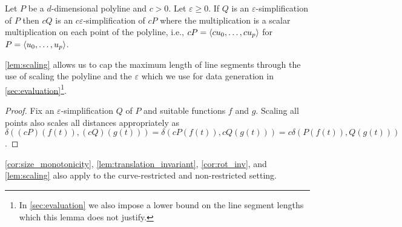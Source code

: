 \begin{lemma}\label{lem:scaling}
	Let \(P\) be a \(d\)-dimensional polyline and \(c > 0\). Let \(\varepsilon \geq 0\). If \(Q\) is an \(\varepsilon\)-simplification of \(P\) then \(cQ\) is an \(c\varepsilon\)-simplification of \(cP\) where the multiplication is a scalar multiplication on  each point of the polyline, i.e., \(cP = \left\langle cu_0, \dots, cu_p\right\rangle\) for \(P = \left\langle u_0,\dots, u_p\right\rangle\).
\end{lemma}

\cref{lem:scaling} allows us to cap the maximum length of line segments through the use of scaling the polyline and the \(\varepsilon\) which we use for data generation in \cref{sec:evaluation}\footnote{In \cref{sec:evaluation} we also impose a lower bound on the line segment lengths which this lemma does not justify. }.

\begin{proof}
	Fix an \(\varepsilon\)-simplification \(Q\) of \(P\) and suitable functions \(f\) and \(g\). Scaling all points also scales all distances appropriately as \(\delta((cP)(f(t)), (cQ)(g(t))) = \delta(cP(f(t)), cQ(g(t))) = c\delta(P(f(t)), Q(g(t)))\).
\end{proof}

\begin{remark}
	\cref{cor:size_monotonicity}, \cref{lem:translation_invariant}, \cref{cor:rot_inv}, and \cref{lem:scaling} also apply to the curve-restricted and non-restricted setting.
\end{remark}

